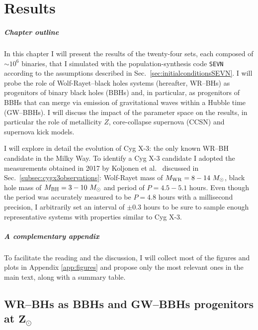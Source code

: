 \documentclass[a4paper,titlepage]{book}     	%
\newcommand{\sun}{\ensuremath{_\odot}}
\newcommand{\msun}{\ensuremath{M\sun}}
\begin{document}

\chapter{Results}\label{sec:results}
\paragraph{Chapter outline} In this chapter I will present the results of the twenty-four sets, each composed of $\sim 10^6$ binaries, that I simulated with the population-synthesis code \texttt{SEVN} according to the assumptions described in Sec.\ \ref{sec:initialconditionsSEVN}. I will probe the role of Wolf-Rayet--black holes systems (hereafter, WR--BHs) as progenitors of binary black holes (BBHs) and, in particular, as progenitors of BBHs that can merge via emission of gravitational waves within a Hubble time (GW--BBHs). I will discuss the impact of the parameter space on the results, in particular the role of metallicity $Z$, core-collapse supernova (CCSN) and supernova kick models. 

I will explore in detail the evolution of Cyg X-3: the only known WR--BH candidate in the Milky Way. To identify a Cyg X-3 candidate I adopted the measurements obtained in 2017 by Koljonen et al.\ \cite{CygX-3_Koljonen2017} discussed in Sec.\ \ref{subsec:cygx3observations}: Wolf-Rayet mass of $M_{\rm WR} = 8-14~\msun$, black hole mass of $M_{\rm BH}=3-10~\msun$ and period of $P=4.5-5.1$ hours. Even though the period was accurately measured to be $P=4.8$ hours with a millisecond precision, I arbitrarily set an interval of $\pm 0.3$ hours to be sure to sample enough representative systems with properties similar to Cyg X-3.

\paragraph{A complementary appendix} To facilitate the reading and the discussion, I will collect most of the figures and plots in Appendix \ref{app:figures} and propose only the most relevant ones in the main text, along with a summary table.



\section{WR--BHs as BBHs and GW--BBHs progenitors at $\mathbf{Z_\odot}$} \label{sec:roleWRBH}
\end{document}
